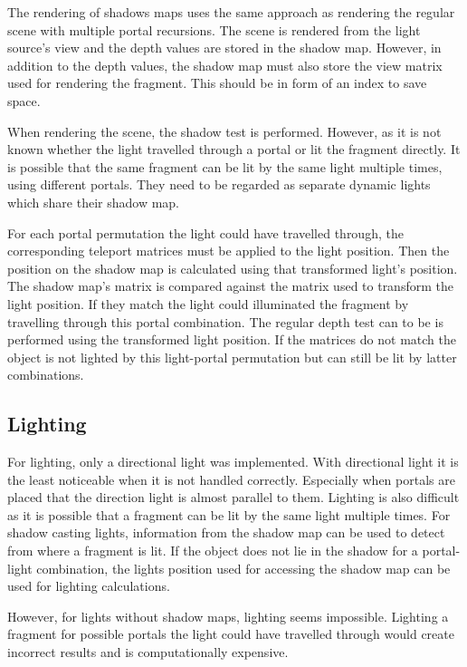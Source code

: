The rendering of shadows maps uses the same approach as rendering the regular scene with multiple portal recursions. The scene is rendered from the light source's view and the depth values are stored in the shadow map. However, in addition to the depth values, the shadow map must also store the view matrix used for rendering the fragment. This should be in form of an index to save space.

When rendering the scene, the shadow test is performed. However, as it is not known whether the light travelled through a portal or lit the fragment directly. It is possible that the same fragment can be lit by the same light multiple times, using different portals. They need to be regarded as separate dynamic lights which share their shadow map. 

For each portal permutation the light could have travelled through, the corresponding teleport matrices must be applied to the light position. Then the position on the shadow map is calculated using that transformed light's position. The shadow map's matrix is compared against the matrix used to transform the light position. If they match the light could illuminated the fragment by travelling through this portal combination. The regular depth test can to be is performed using the transformed light position. If the matrices do not match the object is not lighted by this light-portal permutation but can still be lit by latter combinations.


\subsection{Lighting}
For lighting, only a directional light was implemented. With directional light it is the least noticeable when it is not handled correctly. Especially when portals are placed that the direction light is almost parallel to them.
Lighting is also difficult as it is possible that a fragment can be lit by the same light multiple times. For shadow casting lights, information from the shadow map can be used to detect from where a fragment is lit. If the object does not lie in the shadow for a portal-light combination, the lights position used for accessing the shadow map can be used for lighting calculations.

However, for lights without shadow maps, lighting seems impossible. Lighting a fragment for possible portals the light could have travelled through would create incorrect results and is computationally expensive. 


